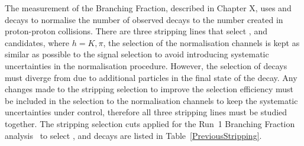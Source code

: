 The measurement of the \bsmumu Branching Fraction, described in Chapter X, uses \bujpsik and \bdkpi decays to normalise the number of observed \bsmumu decays to the number created in proton-proton collisions. There are three stripping lines that select \bmumu, \bujpsik and \bhh candidates, where $h = K, \pi$, the selection of the normalisation channels is kept as similar as possible to the signal selection to avoid introducing systematic uncertainties in the normalisation procedure. However, the selection of \bujpsik decays must diverge from \bsmumu due to additional particles in the final state of the decay. Any changes made to the \bmumu stripping selection to improve the selection efficiency must be included in the selection to the normalisation channels to keep the systematic uncertainties under control, therefore all three stripping lines must be studied together. The stripping selection cuts applied for the Run~1 Branching Fraction analysis~\cite{} to select \bmumu, \bhh and \bujpsik decays are listed in Table~\ref{PreviousStripping}.

